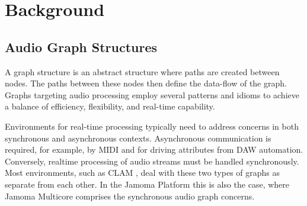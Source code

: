 \documentclass[twoside,a4paper]{article}
\begin{document}

%
%  
%





%
\section{Background} %
%



\subsection{Audio Graph Structures} %

A graph structure is an abstract structure where paths are created between nodes. %
The paths between these nodes then define the data-flow of the graph.  
Graphs targeting audio processing employ several patterns and idioms to achieve a balance of efficiency, flexibility, and real-time capability.

Environments for real-time processing typically need to address concerns in both synchronous and asynchronous contexts.  
Asynchronous communication is required, for example, by MIDI and for driving attributes from DAW automation.  
Conversely, realtime processing of audio streams must be handled synchronously.  
Most environments, such as CLAM  \cite{Amatraian:2007}, deal with these two types of graphs as separate from each other.  
In the Jamoma Platform this is also the case, where Jamoma Multicore comprises the synchronous audio graph concerns.
\end{document}
